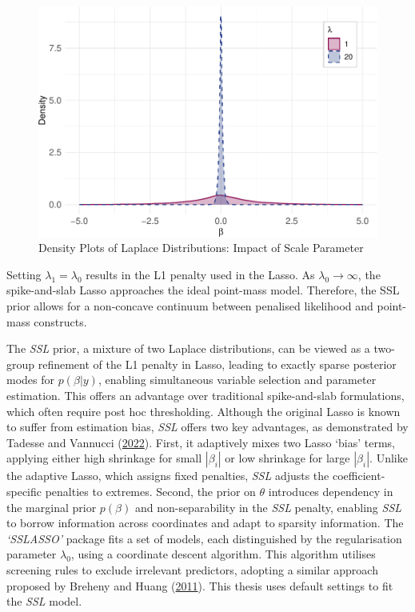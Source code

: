 \documentclass[
  11pt,
]{article}
\begin{document}
\begin{figure}[H]

{\centering \includegraphics[width=0.75\linewidth]{dissertation_files/figure-latex/SSLASSO Priors-1} 

}

\caption{Density Plots of Laplace Distributions: Impact of Scale Parameter}\label{fig:SSLASSO Priors}
\end{figure}

Setting \(\lambda_1 = \lambda_0\) results in the L1 penalty used in the
Lasso. As \(\lambda_0 \rightarrow \infty\), the spike-and-slab Lasso
approaches the ideal point-mass model. Therefore, the SSL prior allows
for a non-concave continuum between penalised likelihood and point-mass
constructs.

The \emph{SSL} prior, a mixture of two Laplace distributions, can be
viewed as a two-group refinement of the L1 penalty in Lasso, leading to
exactly sparse posterior modes for \(p(\beta | y)\), enabling
simultaneous variable selection and parameter estimation. This offers an
advantage over traditional spike-and-slab formulations, which often
require post hoc thresholding. Although the original Lasso is known to
suffer from estimation bias, \emph{SSL} offers two key advantages, as
demonstrated by Tadesse and Vannucci
(\protect\hyperlink{ref-Tadesse2022}{2022}). First, it adaptively mixes
two Lasso `bias' terms, applying either high shrinkage for small
\(|\beta_i|\) or low shrinkage for large \(|\beta_i|\). Unlike the
adaptive Lasso, which assigns fixed penalties, \emph{SSL} adjusts the
coefficient-specific penalties to extremes. Second, the prior on
\(\theta\) introduces dependency in the marginal prior \(p(\beta)\) and
non-separability in the \emph{SSL} penalty, enabling \emph{SSL} to
borrow information across coordinates and adapt to sparsity information.
The \emph{`SSLASSO'} package fits a set of models, each distinguished by
the regularisation parameter \(\lambda_0\), using a coordinate descent
algorithm. This algorithm utilises screening rules to exclude irrelevant
predictors, adopting a similar approach proposed by Breheny and Huang
(\protect\hyperlink{ref-Breheny2011}{2011}). This thesis uses default
settings to fit the \emph{SSL} model.
\end{document}
